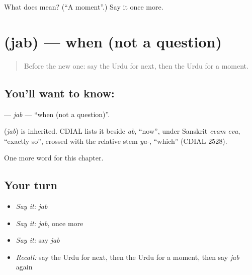 \begin{tcolorbox}[breakable,colback=teal!4,colframe=teal!35!black,title={Before you move on}]
What does  mean? (\textquotedblleft{}A moment\textquotedblright{}.) Say it once more.
\end{tcolorbox}
\section[\texorpdfstring{\ur{جب} (jab)}{جب (jab)}]{ (jab) — when (not a question)}

\label{lesson:UR-C96-jab}



\begin{quote}
Before the new one: say the Urdu for next, then the Urdu for a moment.
\end{quote}

\subsection*{You'll want to know: }
\textbf{} — \emph{jab} — \textquotedblleft{}when (not a question)\textquotedblright{}.

\begin{cousinweb}
\textbf{} (\emph{jab}) is inherited. CDIAL lists it beside \emph{ab}, \textquotedblleft{}now\textquotedblright{}, under Sanskrit \emph{evam eva}, \textquotedblleft{}exactly so\textquotedblright{}, crossed with the relative stem \emph{ya-}, \textquotedblleft{}which\textquotedblright{} (CDIAL 2528).
\end{cousinweb}

\begin{grammarlens}[title={What you've built}]
One more word for this chapter.
\end{grammarlens}

\subsection*{Your turn}
\begin{itemize}
\raggedright
  \item \emph{Say it:} \emph{jab}
  \item \emph{Say it:} \emph{jab}, once more
  \item \emph{Say it:} say \emph{jab}
  \item \emph{Recall:} say the Urdu for next, then the Urdu for a moment, then say \emph{jab} again
\end{itemize}

